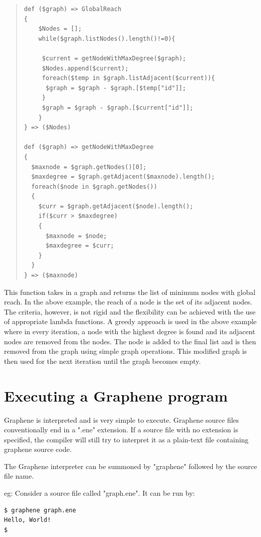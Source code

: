 \documentclass[a4paper]{article}
\begin{document}
\begin{quote}
\begin{verbatim}
def ($graph) => GlobalReach
{
    $Nodes = [];
    while($graph.listNodes().length()!=0){
    
     $current = getNodeWithMaxDegree($graph);
     $Nodes.append($current);
     foreach($temp in $graph.listAdjacent($current)){
      $graph = $graph - $graph.[$temp["id"]];
     }
     $graph = $graph - $graph.[$current["id"]];
    }
} => ($Nodes)

def ($graph) => getNodeWithMaxDegree 
{
  $maxnode = $graph.getNodes()[0];
  $maxdegree = $graph.getAdjacent($maxnode).length();
  foreach($node in $graph.getNodes())
  {
    $curr = $graph.getAdjacent($node).length();
    if($curr > $maxdegree)
    {
      $maxnode = $node;
      $maxdegree = $curr;
    }
  }
} => ($maxnode)
\end{verbatim}
\end{quote}

\noindent This function takes in a graph and returns the list of minimum nodes with global reach. In the above example, the reach of a node is the set of its adjacent nodes. The criteria, however, is not rigid and the flexibility can be achieved with the use of appropriate lambda functions. A greedy approach is used in the above example where in every iteration, a node with the highest degree is found and its adjacent nodes are removed from the nodes. The node is added to the final list and is then removed from the graph using simple graph operations. This modified graph is then used for the next iteration until the graph becomes empty.
\newline

\section{Executing a Graphene program}

Graphene is interpreted and is very simple to execute. Graphene source files conventionally end in a ".ene" extension. If a source file with no extension is specified, the compiler will still try to interpret it as a plain-text file containing graphene source code.

The Graphene interpreter can be summoned by "graphene" followed by the source file name.

eg: Consider a source file called "graph.ene". It can be run by:

\begin{verbatim}
$ graphene graph.ene
Hello, World!
$
\end{verbatim}
\end{document}
